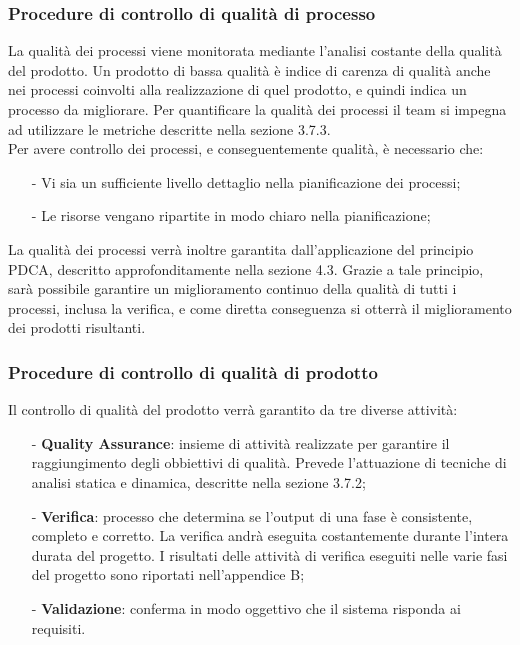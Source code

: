 \subsubsection{Procedure di controllo di qualità di processo}
La qualità dei processi viene monitorata mediante l'analisi costante della qualità del prodotto. Un prodotto di bassa qualità è indice di carenza di qualità anche nei processi coinvolti alla realizzazione di quel prodotto, e quindi indica un processo da migliorare. Per quantificare la qualità dei processi il team si impegna ad utilizzare le metriche descritte nella sezione 3.7.3.
\\
Per avere controllo dei processi, e conseguentemente qualità, è necessario che:
\begin{itemize}
	\item[-] Vi sia un sufficiente livello dettaglio nella pianificazione dei processi;
	\item[-] Le risorse vengano ripartite in modo chiaro nella pianificazione;
\end{itemize}
La qualità dei processi verrà inoltre garantita dall'applicazione del principio PDCA, descritto approfonditamente nella sezione 4.3. Grazie a tale principio, sarà possibile garantire un miglioramento continuo della qualità di tutti i processi, inclusa la verifica, e come diretta conseguenza si otterrà il miglioramento dei prodotti risultanti.

\subsubsection{Procedure di controllo di qualità di prodotto}
Il controllo di qualità del prodotto verrà garantito da tre diverse attività:
\begin{itemize}
	\item[-] \textbf{Quality Assurance}: insieme di attività realizzate per garantire il raggiungimento degli obbiettivi di qualità. Prevede l'attuazione di tecniche di analisi statica e dinamica, descritte nella sezione 3.7.2;
	\item[-] \textbf{Verifica}: processo che determina se l'output di una fase è consistente, completo e corretto. La verifica andrà eseguita costantemente durante l'intera durata del progetto. I risultati delle attività di verifica eseguiti nelle varie fasi del progetto sono riportati nell'appendice B;
	\item[-] \textbf{Validazione}: conferma in modo oggettivo che il sistema risponda ai requisiti.
\end{itemize}

